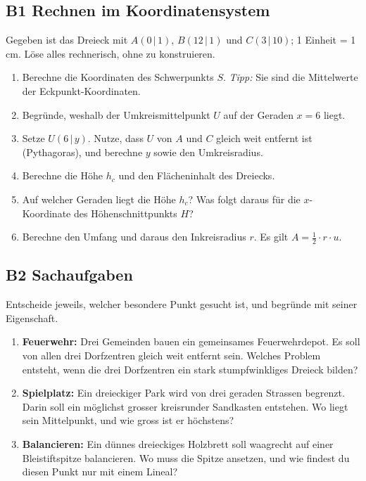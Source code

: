 \documentclass[11pt,a4paper]{article}
\begin{document}
\subsection{B1 \quad Rechnen im Koordinatensystem}
Gegeben ist das Dreieck mit $A(0\,|\,1)$, $B(12\,|\,1)$ und $C(3\,|\,10)$; 1 Einheit = 1 cm. L\"ose alles rechnerisch, ohne zu konstruieren.
\begin{enumerate}
\item Berechne die Koordinaten des Schwerpunkts $S$. \emph{Tipp:} Sie sind die Mittelwerte der Eckpunkt-Koordinaten.
\item Begr\"unde, weshalb der Umkreismittelpunkt $U$ auf der Geraden $x = 6$ liegt.
\item Setze $U(6\,|\,y)$. Nutze, dass $U$ von $A$ und $C$ gleich weit entfernt ist (Pythagoras), und berechne $y$ sowie den Umkreisradius.
\item Berechne die H\"ohe $h_c$ und den Fl\"acheninhalt des Dreiecks.
\item Auf welcher Geraden liegt die H\"ohe $h_c$? Was folgt daraus f\"ur die $x$-Koordinate des H\"ohenschnittpunkts $H$?
\item Berechne den Umfang und daraus den Inkreisradius $r$. Es gilt $A = \tfrac12 \cdot r \cdot u$.
\end{enumerate}

\subsection{B2 \quad Sachaufgaben}
Entscheide jeweils, welcher besondere Punkt gesucht ist, und begr\"unde mit seiner Eigenschaft.
\begin{enumerate}
\item \textbf{Feuerwehr:} Drei Gemeinden bauen ein gemeinsames Feuerwehrdepot. Es soll von allen drei Dorfzentren gleich weit entfernt sein. Welches Problem entsteht, wenn die drei Dorfzentren ein stark stumpfwinkliges Dreieck bilden?
\item \textbf{Spielplatz:} Ein dreieckiger Park wird von drei geraden Strassen begrenzt. Darin soll ein m\"oglichst grosser kreisrunder Sandkasten entstehen. Wo liegt sein Mittelpunkt, und wie gross ist er h\"ochstens?
\item \textbf{Balancieren:} Ein d\"unnes dreieckiges Holzbrett soll waagrecht auf einer Bleistiftspitze balancieren. Wo muss die Spitze ansetzen, und wie findest du diesen Punkt nur mit einem Lineal?
\end{enumerate}
\end{document}
